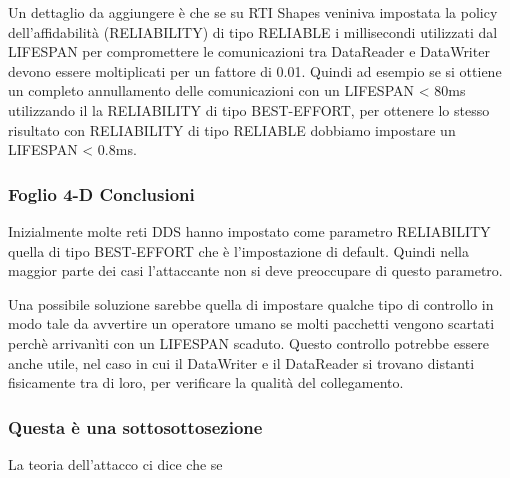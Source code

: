 Un dettaglio da aggiungere è che se su RTI Shapes veniniva impostata la policy
dell'affidabilità (RELIABILITY) di tipo RELIABLE i millisecondi utilizzati
dal LIFESPAN per compromettere le comunicazioni tra DataReader e DataWriter
devono essere moltiplicati per un fattore di 0.01. Quindi ad esempio se si 
ottiene un completo annullamento delle comunicazioni con un LIFESPAN < 80ms 
utilizzando il la RELIABILITY di tipo BEST-EFFORT, per ottenere lo stesso 
risultato con RELIABILITY di tipo RELIABLE dobbiamo impostare un
LIFESPAN < 0.8ms.

\subsubsection{Foglio 4-D Conclusioni}
Inizialmente molte reti DDS hanno impostato come parametro RELIABILITY quella
di tipo BEST-EFFORT che è l'impostazione di default. Quindi nella maggior parte
dei casi l'attaccante non si deve preoccupare di questo parametro.

Una possibile soluzione sarebbe quella di impostare qualche tipo di controllo
in modo tale da avvertire un operatore umano se molti pacchetti vengono 
scartati perchè arrivanìti con un LIFESPAN scaduto. Questo controllo potrebbe
essere anche utile, nel caso in cui il DataWriter e il DataReader si trovano
distanti fisicamente tra di loro, per verificare la qualità del collegamento.



\subsubsection{Questa è una sottosottosezione}
La teoria dell'attacco ci dice che se 


\setlength{\arrayrulewidth}{1.0pt} %



